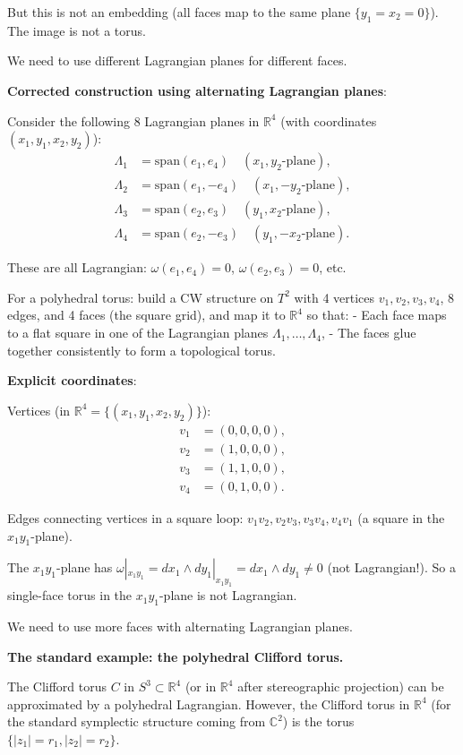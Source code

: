 \documentclass[12pt]{article}
\theoremstyle{definition}
\begin{document}
But this is not an embedding (all faces map to the same plane $\{y_1=x_2=0\}$). The image is not a torus.

We need to use different Lagrangian planes for different faces.

\textbf{Corrected construction using alternating Lagrangian planes}:

Consider the following 8 Lagrangian planes in $\mathbb{R}^4$ (with coordinates $(x_1,y_1,x_2,y_2)$):
\begin{align*}
\Lambda_1 &= \mathrm{span}(e_1, e_4) \quad(x_1,y_2\text{-plane}), \\
\Lambda_2 &= \mathrm{span}(e_1, -e_4) \quad(x_1, -y_2\text{-plane}), \\
\Lambda_3 &= \mathrm{span}(e_2, e_3) \quad(y_1,x_2\text{-plane}), \\
\Lambda_4 &= \mathrm{span}(e_2, -e_3) \quad(y_1,-x_2\text{-plane}).
\end{align*}

These are all Lagrangian: $\omega(e_1,e_4) = 0$, $\omega(e_2,e_3) = 0$, etc.

For a polyhedral torus: build a CW structure on $T^2$ with 4 vertices $v_1,v_2,v_3,v_4$, 8 edges, and 4 faces (the square grid), and map it to $\mathbb{R}^4$ so that:
- Each face maps to a flat square in one of the Lagrangian planes $\Lambda_1,\ldots,\Lambda_4$,
- The faces glue together consistently to form a topological torus.

\textbf{Explicit coordinates}:

Vertices (in $\mathbb{R}^4 = \{(x_1,y_1,x_2,y_2)\}$):
\begin{align*}
v_1 &= (0,0,0,0),\\
v_2 &= (1,0,0,0),\\
v_3 &= (1,1,0,0),\\
v_4 &= (0,1,0,0).
\end{align*}

Edges connecting vertices in a square loop: $v_1v_2, v_2v_3, v_3v_4, v_4v_1$ (a square in the $x_1y_1$-plane).

The $x_1y_1$-plane has $\omega|_{x_1y_1} = dx_1\wedge dy_1|_{x_1y_1} = dx_1\wedge dy_1\neq 0$ (not Lagrangian!). So a single-face torus in the $x_1y_1$-plane is not Lagrangian.

We need to use more faces with alternating Lagrangian planes.

\textbf{The standard example: the polyhedral Clifford torus.}

The Clifford torus $C$ in $S^3\subset\mathbb{R}^4$ (or in $\mathbb{R}^4$ after stereographic projection) can be approximated by a polyhedral Lagrangian. However, the Clifford torus in $\mathbb{R}^4$ (for the standard symplectic structure coming from $\mathbb{C}^2$) is the torus $\{|z_1| = r_1, |z_2| = r_2\}$.
\end{document}
